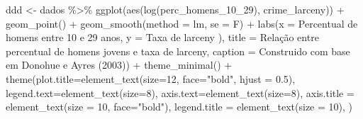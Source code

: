 \documentclass[
]{article}
\newenvironment{Shaded}{\begin{snugshade}}{\end{snugshade}}
\newcommand{\AttributeTok}[1]{\textcolor[rgb]{0.77,0.63,0.00}{#1}}
\newcommand{\DecValTok}[1]{\textcolor[rgb]{0.00,0.00,0.81}{#1}}
\newcommand{\FloatTok}[1]{\textcolor[rgb]{0.00,0.00,0.81}{#1}}
\newcommand{\FunctionTok}[1]{\textcolor[rgb]{0.00,0.00,0.00}{#1}}
\newcommand{\NormalTok}[1]{#1}
\newcommand{\OtherTok}[1]{\textcolor[rgb]{0.56,0.35,0.01}{#1}}
\newcommand{\SpecialCharTok}[1]{\textcolor[rgb]{0.00,0.00,0.00}{#1}}
\newcommand{\StringTok}[1]{\textcolor[rgb]{0.31,0.60,0.02}{#1}}
\begin{document}
\begin{Shaded}
\begin{Highlighting}[]
\NormalTok{ddd }\OtherTok{\textless{}{-}}\NormalTok{ dados }\SpecialCharTok{\%\textgreater{}\%} 
  \FunctionTok{ggplot}\NormalTok{(}\FunctionTok{aes}\NormalTok{(}\FunctionTok{log}\NormalTok{(perc\_homens\_10\_29), crime\_larceny)) }\SpecialCharTok{+}
  \FunctionTok{geom\_point}\NormalTok{() }\SpecialCharTok{+} 
  \FunctionTok{geom\_smooth}\NormalTok{(}\AttributeTok{method =} \StringTok{\textquotesingle{}lm\textquotesingle{}}\NormalTok{, }\AttributeTok{se =}\NormalTok{ F) }\SpecialCharTok{+}
  \FunctionTok{labs}\NormalTok{(}\AttributeTok{x =} \StringTok{\textquotesingle{}Percentual de homens entre 10 e 29 anos\textquotesingle{}}\NormalTok{,}
       \AttributeTok{y =} \StringTok{\textquotesingle{}Taxa de larceny )\textquotesingle{}}\NormalTok{,}
       \AttributeTok{title =} \StringTok{\textquotesingle{}Relação entre percentual de homens jovens e taxa de larceny\textquotesingle{}}\NormalTok{,}
       \AttributeTok{caption =} \StringTok{\textquotesingle{}Construido com base em Donohue e Ayres (2003)\textquotesingle{}}\NormalTok{) }\SpecialCharTok{+} 
  \FunctionTok{theme\_minimal}\NormalTok{() }\SpecialCharTok{+}
  \FunctionTok{theme}\NormalTok{(}\AttributeTok{plot.title=}\FunctionTok{element\_text}\NormalTok{(}\AttributeTok{size=}\DecValTok{12}\NormalTok{, }\AttributeTok{face=}\StringTok{"bold"}\NormalTok{, }\AttributeTok{hjust =} \FloatTok{0.5}\NormalTok{),}
        \AttributeTok{legend.text=}\FunctionTok{element\_text}\NormalTok{(}\AttributeTok{size=}\DecValTok{8}\NormalTok{),}
        \AttributeTok{axis.text=}\FunctionTok{element\_text}\NormalTok{(}\AttributeTok{size=}\DecValTok{8}\NormalTok{),}
        \AttributeTok{axis.title =} \FunctionTok{element\_text}\NormalTok{(}\AttributeTok{size =} \DecValTok{10}\NormalTok{, }\AttributeTok{face=}\StringTok{"bold"}\NormalTok{),}
        \AttributeTok{legend.title =} \FunctionTok{element\_text}\NormalTok{(}\AttributeTok{size =} \DecValTok{10}\NormalTok{),}
\NormalTok{  )}


\end{Highlighting}
\end{Shaded}
\end{document}
